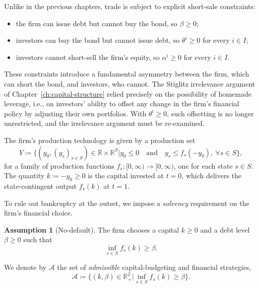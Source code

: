 \documentclass[11pt,a4paper,oneside]{book}
\def\R{\mathbb{R}}
\def\leq{\leqslant}
\def\geq{\geqslant}
\def\et{\quad \text{and} \quad}
\theoremstyle{plain}
\theoremstyle{definition}
\newtheorem{assumption}[theorem]{Assumption}
\theoremstyle{remark}
\numberwithin{equation}{chapter}
\begin{document}
Unlike in the previous chapters, trade is subject to explicit short-sale constraints:
\begin{itemize}
  \item the firm can issue debt but cannot buy the bond, so $\beta \geq 0$;
  \item investors can buy the bond but cannot issue debt, so $\theta^i \geq 0$ for every $i \in I$;
  \item investors cannot short-sell the firm's equity, so $\alpha^i \geq 0$ for every $i \in I$.
\end{itemize}
These constraints introduce a fundamental asymmetry between the firm, which can short the bond, and investors, who cannot.
The Stiglitz irrelevance argument of Chapter~\ref{ch:capital-structure} relied precisely on the possibility of homemade leverage, i.e., on investors' ability to offset any change in the firm's financial policy by adjusting their own portfolios.
With $\theta^i \geq 0$, such offsetting is no longer unrestricted, and the irrelevance argument must be re-examined.

The firm's production technology is given by a production set
\begin{equation}\label{eq:Y-BGR}
  Y \coloneqq \bigl\{ (y_0, (y_s)_{s \in S}) \in \R \times \R^S \vert y_0 \leq 0 \et y_s \leq f_s(-y_0), \ \forall s \in S \bigr\},
\end{equation}
for a family of production functions $f_s : [0, \infty) \to [0, \infty)$, one for each state $s \in S$.
The quantity $k \coloneqq - y_0 \geq 0$ is the capital invested at $t=0$, which delivers the state-contingent output $f_s(k)$ at $t=1$.

To rule out bankruptcy at the outset, we impose a \emph{solvency} requirement on the firm's financial choice.

\begin{assumption}[No-default]\label{ass:no-default}
The firm chooses a capital $k \geq 0$ and a debt level $\beta \geq 0$ such that
\begin{equation*}
  \inf_{s \in S} f_s(k) \geq \beta.
\end{equation*}
\end{assumption}

We denote by $\mathcal{A}$ the set of \emph{admissible} capital-budgeting and financial strategies,
\begin{equation}\label{eq:admissible-set}
  \mathcal{A} \coloneqq \bigl\{ (k, \beta) \in \R_+^2 \vert \inf_{s \in S} f_s(k) \geq \beta \bigr\}.
\end{equation}
\end{document}
